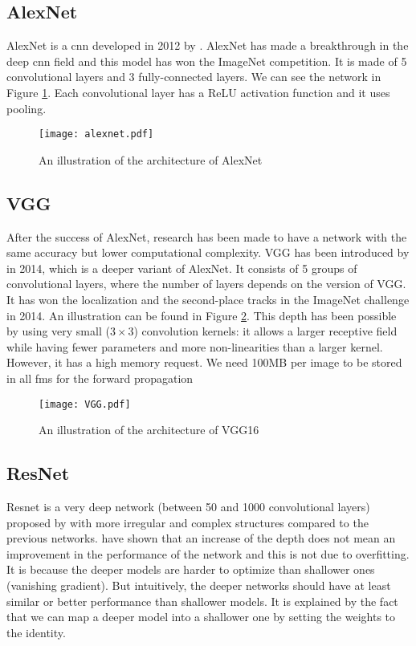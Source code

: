 \subsection{AlexNet}
AlexNet is a \acrshort{cnn} developed in 2012 by \textcite{krizhevsky_imagenet_2012}. AlexNet has made a breakthrough in the deep \acrshort{cnn} field and this model has won the ImageNet competition. It is made of 5 convolutional layers and 3 fully-connected layers. We can see the network in Figure \ref{fig:alexnet}. Each convolutional layer has a ReLU activation function and it uses pooling.
%
\begin{figure}
    \centering
    \texttt{[image: alexnet.pdf]}
    \caption{An illustration of the architecture of AlexNet \cite{krizhevsky_imagenet_2012}}
    \label{fig:alexnet}
\end{figure}
%
\subsection{VGG}
After the success of AlexNet, research has been made to have a network with the same accuracy but lower computational complexity. VGG has been introduced by \textcite{simonyan_very_2015} in 2014, which is a deeper variant of AlexNet. It consists of 5 groups of convolutional layers, where the number of layers depends on the version of VGG. It has won the localization and the second-place tracks in the ImageNet challenge in 2014. An illustration can be found in Figure \ref{fig:vgg}. This depth has been possible by using very small ($3 \times 3$) convolution kernels: it allows a larger receptive field while having fewer parameters and more non-linearities than a larger kernel. However, it has a high memory request. We need 100MB per image to be stored in all \acrshort{fm}s for the forward propagation
%
\begin{figure}
    \centering
    \texttt{[image: VGG.pdf]}
    \caption{An illustration of the architecture of VGG16 \cite{simonyan_very_2015}}
    \label{fig:vgg}
\end{figure}
%
\subsection{ResNet}
Resnet is a very deep network (between 50 and 1000 convolutional layers) proposed by \textcite{he_deep_2015} with more irregular and complex structures compared to the previous networks. \textcite{he_deep_2015} have shown that an increase of the depth does not mean an improvement in the performance of the network and this is not due to overfitting. It is because the deeper models are harder to optimize than shallower ones (vanishing gradient). But intuitively, the deeper networks should have at least similar or better performance than shallower models. It is explained by the fact that we can map a deeper model into a shallower one by setting the weights to the identity.

